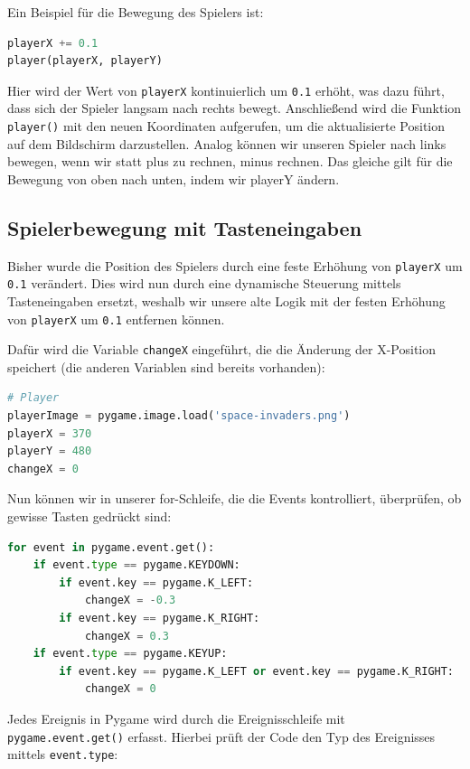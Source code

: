 \documentclass{article}
\begin{document}
Ein Beispiel für die Bewegung des Spielers ist:

\begin{lstlisting}[style=pythonstyle, language=Python]
playerX += 0.1
player(playerX, playerY)
\end{lstlisting}

Hier wird der Wert von \texttt{playerX} kontinuierlich um \texttt{0.1} erhöht, was dazu führt, dass sich der Spieler langsam nach rechts bewegt. Anschließend wird die Funktion \texttt{player()} mit den neuen Koordinaten aufgerufen, um die aktualisierte Position auf dem Bildschirm darzustellen. Analog können wir unseren Spieler nach links bewegen, wenn wir statt plus zu rechnen, minus rechnen. Das gleiche gilt für die Bewegung von oben nach unten, indem wir playerY ändern.

\subsection{Spielerbewegung mit Tasteneingaben}
Bisher wurde die Position des Spielers durch eine feste Erhöhung von \texttt{playerX} um \texttt{0.1} verändert. Dies wird nun durch eine dynamische Steuerung mittels Tasteneingaben ersetzt, weshalb wir unsere alte Logik mit der festen Erhöhung von \texttt{playerX} um \texttt{0.1} entfernen können.

Dafür wird die Variable \texttt{changeX} eingeführt, die die Änderung der X-Position speichert (die anderen Variablen sind bereits vorhanden):

\begin{lstlisting}[style=pythonstyle, language=Python]
# Player
playerImage = pygame.image.load('space-invaders.png')
playerX = 370
playerY = 480
changeX = 0
\end{lstlisting}

Nun können wir in unserer for-Schleife, die die Events kontrolliert, überprüfen, ob gewisse Tasten gedrückt sind:

\begin{lstlisting}[style=pythonstyle, language=Python]
for event in pygame.event.get():
    if event.type == pygame.KEYDOWN:
        if event.key == pygame.K_LEFT:
            changeX = -0.3
        if event.key == pygame.K_RIGHT:
            changeX = 0.3
    if event.type == pygame.KEYUP: 
        if event.key == pygame.K_LEFT or event.key == pygame.K_RIGHT:
            changeX = 0
\end{lstlisting}

Jedes Ereignis in Pygame wird durch die Ereignisschleife mit \texttt{pygame.event.get()} erfasst. Hierbei prüft der Code den Typ des Ereignisses mittels \texttt{event.type}:
\end{document}
